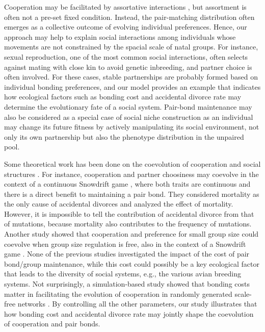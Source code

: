 \documentclass[12pt]{article}
\begin{document}
Cooperation may be facilitated by assortative interactions \citep{Fletcher.Doebeli2006}, but assortment is often not a pre-set fixed condition. Instead, the pair-matching distribution often emerges as a collective outcome of evolving individual preferences. Hence, our approach may help to explain social interactions among individuals whose movements are not constrained by the spacial scale of natal groups. For instance, sexual reproduction, one of the most common social interactions, often selects against mating with close kin to avoid genetic inbreeding, and partner choice is often involved. For these cases, stable partnerships are probably formed based on individual bonding preferences, and our model provides an example that indicates how ecological factors such as bonding cost and accidental divorce rate may determine the evolutionary fate of a social system. Pair-bond maintenance may also be considered as a special case of social niche construction \citep{Odling-Smee.etal2003, Ihara2004} as an individual may change its future fitness by actively manipulating its social environment, not only its own partnership but also the phenotype distribution in the unpaired pool.

Some theoretical work has been done on the coevolution of cooperation and social structures \citep{Perc.Szolnoki2010}. For instance, cooperation and partner choosiness may coevolve in the context of a continuous Snowdrift game \citep{McNamara.etal2008}, where both traits are continuous and there is a direct benefit to maintaining a pair bond. They considered mortality as the only cause of accidental divorces and analyzed the effect of mortality. However, it is impossible to tell the contribution of accidental divorce from that of mutations, because mortality also contributes to the frequency of mutations. Another study showed that cooperation and preference for small group size could coevolve when group size regulation is free, also in the context of a Snowdrift game \citep{Powers.etal2011}. None of the previous studies investigated the impact of the cost of pair bond/group maintenance, while this cost could possibly be a key ecological factor that leads to the diversity of social systems, e.g., the various avian breeding systems. Not surprisingly, a simulation-based study showed that bonding costs matter in facilitating the evolution of cooperation in randomly generated scale-free networks  \citep{Masuda2007}. By controlling all the other parameters, our study illustrates that how bonding cost and accidental divorce rate may jointly shape the coevolution of cooperation and pair bonds. 
\end{document}
